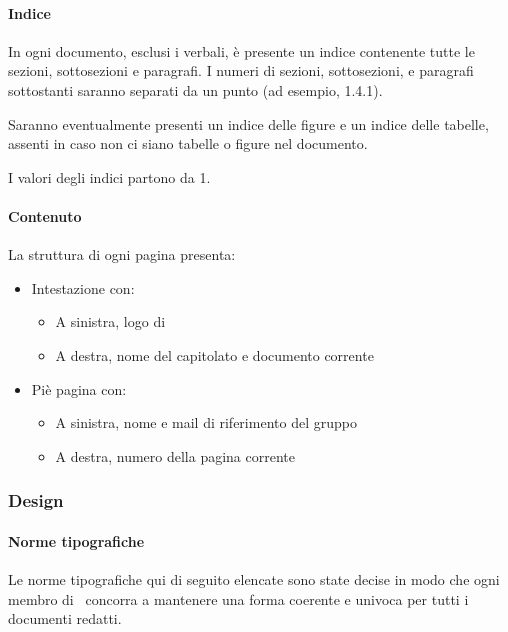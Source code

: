 			\paragraph{Indice}\label{PS:Documentazione:Struttura:Indice}
			In ogni documento, esclusi i verbali, è presente un indice contenente tutte le sezioni, sottosezioni e paragrafi. I numeri di sezioni, sottosezioni,
			e paragrafi sottostanti saranno separati da un punto (ad esempio, 1.4.1).\par
			Saranno eventualmente presenti un indice delle
			figure e un indice delle tabelle, assenti in caso non ci siano tabelle o figure nel documento.\par
			I valori degli indici partono da 1.

			\paragraph{Contenuto}\label{PS:Documentazione:Struttura:Contenuto}
			La struttura di ogni pagina presenta:
			\begin{itemize}
				\item Intestazione con:
				\begin{itemize}
					\item A sinistra, logo di \emph{\gruppo}
					\item A destra, nome del capitolato e documento corrente
				\end{itemize}
				\item Piè pagina con:
				\begin{itemize}
					\item A sinistra, nome e mail di riferimento del gruppo
					\item A destra, numero della pagina corrente
				\end{itemize}
			\end{itemize}


		\subsubsection{Design}\label{PS:Documentazione:Design}

			\paragraph{Norme tipografiche}\label{PS:Documentazione:Design:NormeT}
			Le norme tipografiche qui di seguito elencate sono state decise in modo che ogni membro di \gruppo\ concorra a mantenere una forma coerente e univoca
			per tutti i documenti redatti.

